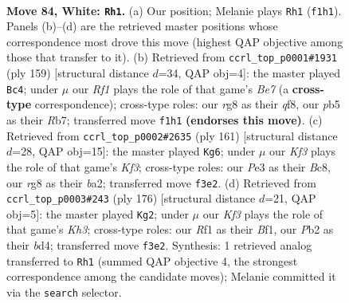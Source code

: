\documentclass[11pt]{article}
\begin{document}
\clearpage

\begin{figure}[p]\centering
\begin{subfigure}{0.46\textwidth}\centering
\resizebox{\linewidth}{!}{%
\newchessgame
\chessboard[
  setfen={6r1/3k4/p7/Ppp2p1p/2p2P1P/4PKP1/1P6/5R2 w - - 13 84},
  showmover=false,
  pgfstyle=straightmove, color=movearrow, markmove={f1-h1}
]}
\caption{}
\end{subfigure}\hfill
\begin{subfigure}{0.46\textwidth}\centering
\resizebox{\linewidth}{!}{%
\newchessgame
\chessboard[
  setfen={5Q2/1r3p2/k3p1p1/p2pP3/P4P1K/4P3/4b3/8 b - - 34 80},
  showmover=false,
  pgfstyle=straightmove, color=movearrow, markmove={e2-c4}
]}
\caption{}
\end{subfigure}
\\[4pt]
\begin{subfigure}{0.46\textwidth}\centering
\resizebox{\linewidth}{!}{%
\newchessgame
\chessboard[
  setfen={2b5/8/2P1pk2/1p1p1p2/1P1P1P2/p3P2P/B7/7K b - - 19 81},
  showmover=false,
  pgfstyle=straightmove, color=movearrow, markmove={f6-g6}
]}
\caption{}
\end{subfigure}\hfill
\begin{subfigure}{0.46\textwidth}\centering
\resizebox{\linewidth}{!}{%
\newchessgame
\chessboard[
  setfen={5k2/p7/6p1/4Pp1p/1p1b1P1P/1P4PK/P7/5B2 w - - 96 89},
  showmover=false,
  pgfstyle=straightmove, color=movearrow, markmove={h3-g2}
]}
\caption{}
\end{subfigure}
\caption{\textbf{Move 84, White: \texttt{Rh1}.} (a) Our position; Melanie plays \texttt{Rh1} (\texttt{f1h1}). Panels (b)--(d) are the retrieved master positions whose correspondence most drove this move (highest QAP objective among those that transfer to it). (b) Retrieved from \texttt{ccrl\_top\_p0001\#1931} (ply 159) [structural distance $d$=34, QAP obj=4]: the master played \texttt{Bc4}; under $\mu$ our \emph{Rf1} plays the role of that game's \emph{Be7} (a \textbf{cross-type} correspondence); cross-type roles: our \emph{r}g8 as their \emph{q}f8, our \emph{p}b5 as their \emph{R}b7; transferred move \texttt{f1h1} \textbf{(endorses this move)}. (c) Retrieved from \texttt{ccrl\_top\_p0002\#2635} (ply 161) [structural distance $d$=28, QAP obj=15]: the master played \texttt{Kg6}; under $\mu$ our \emph{Kf3} plays the role of that game's \emph{Kf3}; cross-type roles: our \emph{P}e3 as their \emph{B}c8, our \emph{r}g8 as their \emph{b}a2; transferred move \texttt{f3e2}. (d) Retrieved from \texttt{ccrl\_top\_p0003\#243} (ply 176) [structural distance $d$=21, QAP obj=5]: the master played \texttt{Kg2}; under $\mu$ our \emph{Kf3} plays the role of that game's \emph{Kh3}; cross-type roles: our \emph{R}f1 as their \emph{B}f1, our \emph{P}b2 as their \emph{b}d4; transferred move \texttt{f3e2}. Synthesis: 1 retrieved analog transferred to \texttt{Rh1} (summed QAP objective 4, the strongest correspondence among the candidate moves); Melanie committed it via the \texttt{search} selector.}
\label{fig:thought-m166}
\end{figure}
\end{document}
